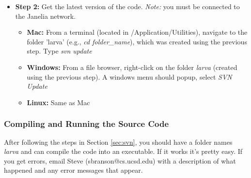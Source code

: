 \documentclass[10pt, onecolumn]{article}
\newcommand{\1}{\textbf{1}}
\begin{document}
\begin{itemize}
\begin{itemize}
 \end{itemize}
 \item \textbf{Step 2: } Get the latest version of the code.  \textit{Note: } you must be connected to the Janelia network.
   \begin{itemize}
   \item \textbf{Mac:} From a terminal (located in /Application/Utilities), navigate to the folder 'larva' (e.g., \textit{cd folder\_name}), which was created using the previous step.  Type \textit{svn update}
   \item \textbf{Windows:} From a file browser, right-click on the folder \textit{larva} (created using the previous step).  A windows menu should popup, select \textit{SVN Update}
   \item \textbf{Linux: } Same as Mac
 \end{itemize}
\end{itemize}

\subsubsection{Compiling and Running the Source Code}
After following the steps in Section \ref{sec:svn}, you should have a folder names \textit{larva} and can compile the code into an executable.  If it works it's pretty easy.  If you get errors, email Steve (sbranson@cs.ucsd.edu) with a description of what happened and any error messages that appear.
\end{document}
